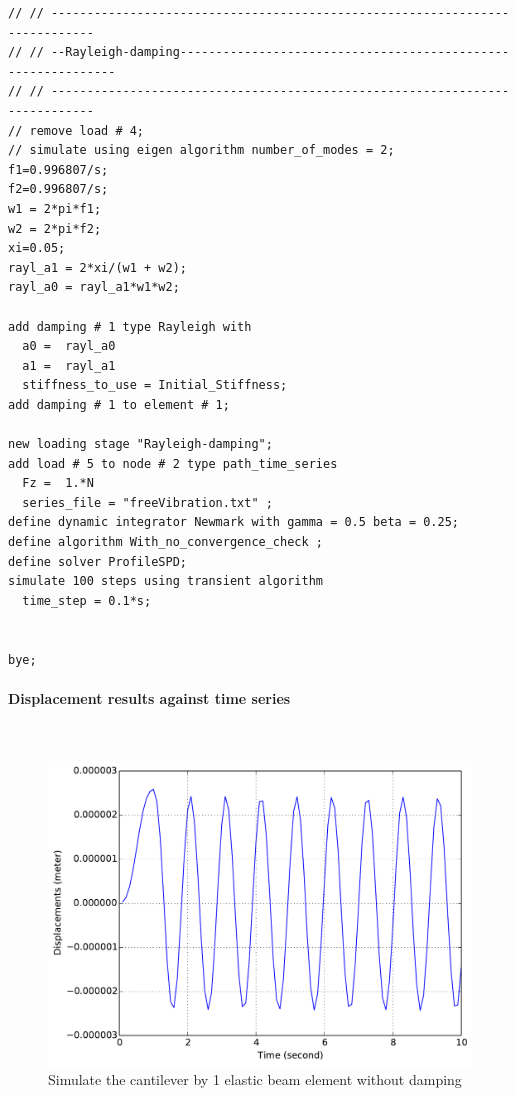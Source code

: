 \begin{lstlisting}
// // ----------------------------------------------------------------------------
// // --Rayleigh-damping-------------------------------------------------------------
// // ----------------------------------------------------------------------------
// remove load # 4;
// simulate using eigen algorithm number_of_modes = 2;
f1=0.996807/s;
f2=0.996807/s;
w1 = 2*pi*f1;
w2 = 2*pi*f2;
xi=0.05;
rayl_a1 = 2*xi/(w1 + w2);
rayl_a0 = rayl_a1*w1*w2;

add damping # 1 type Rayleigh with 
  a0 =  rayl_a0
  a1 =  rayl_a1
  stiffness_to_use = Initial_Stiffness;
add damping # 1 to element # 1;

new loading stage "Rayleigh-damping";
add load # 5 to node # 2 type path_time_series 
  Fz =  1.*N
  series_file = "freeVibration.txt" ;
define dynamic integrator Newmark with gamma = 0.5 beta = 0.25;
define algorithm With_no_convergence_check ;
define solver ProfileSPD;
simulate 100 steps using transient algorithm 
  time_step = 0.1*s;


bye;
\end{lstlisting}

\paragraph{Displacement results against time series} ~

\begin{figure}[!htb]
  \centering
  \includegraphics[width=12cm]{./Figure-files/_Chapter_Appendix_Illustrative_Examples/beam-1element-no-damping.pdf}
  \caption{Simulate the cantilever by 1 elastic beam element without damping}
  \label{fig_1beam_nodamping}
\end{figure}


